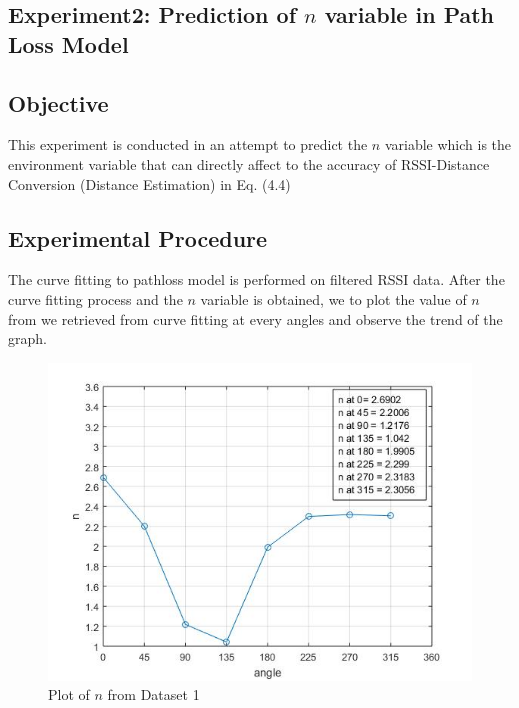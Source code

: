 \subsection{Experiment2: Prediction of $n$ variable in Path Loss Model}
\subsection*{Objective}
This experiment is conducted in an attempt to predict the $n$ variable which is the environment variable that can directly affect to the accuracy of RSSI-Distance Conversion (Distance Estimation) in Eq. (4.4)
\subsection*{Experimental Procedure}
The curve fitting to pathloss model is performed on filtered RSSI data. After the curve fitting process and the $n$ variable is obtained, we to plot the value of $n$ from we retrieved from curve fitting at every angles and observe the trend of the graph.

\begin{figure}[H]
\centering
\includegraphics[width=\textwidth]{Image/pltN1.jpg}
\caption{Plot of $n$ from Dataset 1}
\label{}
\end{figure}

